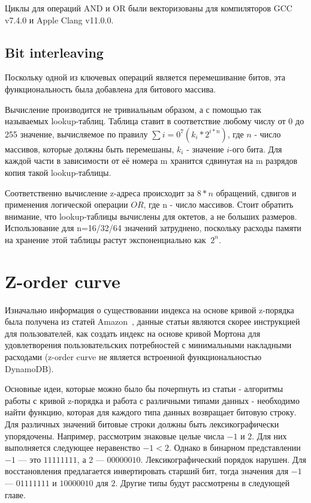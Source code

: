 Циклы для операций AND и OR были векторизованы для компиляторов
GCC v7.4.0 и Apple Clang v11.0.0.

\subsection{Bit interleaving}
Поскольку одной из ключевых операций является перемешивание битов, эта функциональность была добавлена для битового массива.

Вычисление производится не тривиальным образом, а с помощью так называемых lookup-таблиц. Таблица ставит в соответствие любому числу от 0 до 255 значение, вычисляемое по правилу $\sum{i=0}^7(k_i * 2^{i*n})$, где $n$ - число массивов, которые должны быть перемешаны, $k_i$ - значение $i$-ого бита. Для каждой части в зависимости от её номера m хранится сдвинутая на m разрядов копия такой lookup-таблицы.

Соответственно вычисление z-адреса происходит за $8*n$ обращений, сдвигов и применения логической операции $OR$, где n - число массивов. Стоит обратить внимание, что lookup-таблицы вычислены для октетов, а не больших размеров. Использование для n=16/32/64 значений затруднено, поскольку расходы памяти на хранение этой таблицы растут экспоненциально как $~2^n$.


\section{Z-order curve}
Изначально информация о существовании индекса на основе кривой z-порядка была получена из статей Amazon~\cite{DynamoZorderP1, DynamoZorderP2}, данные статьи являются скорее инструкцией для пользователей, как создать индекс на основе кривой Мортона для удовлетворения пользовательских потребностей с минимальными накладными расходами (z-order curve не является встроенной функциональностью DynamoDB).

Основные идеи, которые можно было бы почерпнуть из статьи - алгоритмы работы с кривой z-порядка и работа с различными типами данных - необходимо найти функцию, которая для каждого типа данных возвращает битовую строку. Для различных значений битовые строки должны быть лексикографически упорядочены. Например, рассмотрим знаковые целые числа $-1$ и $2$. Для них выполняется следующее неравенство $-1 < 2$. Однако в бинарном представлении $-1$ --- это $11111111$, а 2 --- $00000010$. Лексикографический порядок нарушен. Для восстановления предлагается инвертировать старший бит, тогда значения для $-1$ --- $01111111$ и $10000010$ для $2$. Другие типы будут рассмотрены в следующей главе.

